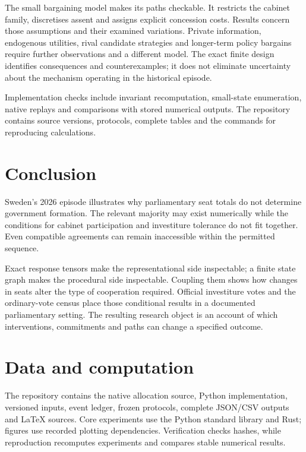 \documentclass[11pt,a4paper]{article}
\begin{document}
The small bargaining model makes its paths checkable. It restricts the cabinet family, discretises assent and assigns explicit concession costs. Results concern those assumptions and their examined variations. Private information, endogenous utilities, rival candidate strategies and longer-term policy bargains require further observations and a different model. The exact finite design identifies consequences and counterexamples; it does not eliminate uncertainty about the mechanism operating in the historical episode.

Implementation checks include invariant recomputation, small-state enumeration, native replays and comparisons with stored numerical outputs. The repository contains source versions, protocols, complete tables and the commands for reproducing calculations.

\section{Conclusion}

Sweden's 2026 episode illustrates why parliamentary seat totals do not determine government formation. The relevant majority may exist numerically while the conditions for cabinet participation and investiture tolerance do not fit together. Even compatible agreements can remain inaccessible within the permitted sequence.

Exact response tensors make the representational side inspectable; a finite state graph makes the procedural side inspectable. Coupling them shows how changes in seats alter the type of cooperation required. Official investiture votes and the ordinary-vote census place those conditional results in a documented parliamentary setting. The resulting research object is an account of which interventions, commitments and paths can change a specified outcome.

\section*{Data and computation}
The repository contains the native allocation source, Python implementation, versioned inputs, event ledger, frozen protocols, complete JSON/CSV outputs and LaTeX sources. Core experiments use the Python standard library and Rust; figures use recorded plotting dependencies. Verification checks hashes, while reproduction recomputes experiments and compares stable numerical results. 

\clearpage
\appendix
{}



\clearpage
\begingroup
\small\raggedright


\endgroup
\end{document}
